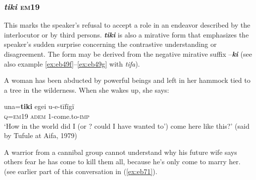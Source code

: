 \documentclass[output=paper]{langsci/langscibook}
\begin{document}
\subsubsection{\textit{tiki} \textsc{em}19} This marks the speaker’s refusal to accept a role in an endeavor described by the interlocutor or by third persons.  \textbf{\textit{tiki}} is also a mirative form that emphasizes the speaker’s sudden surprise concerning the contrastive understanding or disagreement.  The form may be derived from the negative mirative suffix –\textbf{\textit{ki}} (see also example \ref{ex:eb49f}--\ref{ex:eb49g} with \textit{tifa}). 

A woman has been abducted by powerful beings and left in her hammock tied to a tree in the wilderness.  When she wakes up, she says:

\begin{exe}
\ex \label{ex:eb44}
	\gll una=\textbf{tiki} egei u-e-tïfïgï\\
	\textsc{q=em19} \textsc{adem} 1-come.to-\textsc{imp}\\
	\trans  ‘How in the world did I (or ? could I have wanted to’) come here like this?’ (said by Tufule at Aifa, 1979)
\end{exe}

A warrior from a cannibal group cannot understand why his future wife says others fear he has come to kill them all, because he’s only come to marry her. (see earlier part of this conversation in (\ref{ex:eb71}).
\end{document}
